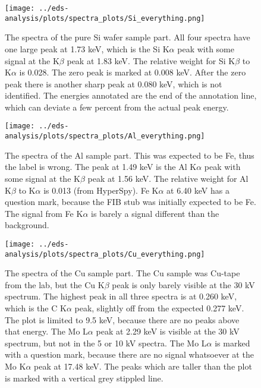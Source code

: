 
\begin{figure}
    \centering
    \texttt{[image: ../eds-analysis/plots/spectra\_plots/Si\_everything.png]}
    \caption{
        The spectra of the pure Si wafer sample part.
        All four spectra have one large peak at 1.73 keV, which is the Si K$\alpha$ peak with some signal at the K$\beta$ peak at 1.83 keV.
        The relative weight for Si K$\beta$ to K$\alpha$ is 0.028.
        The zero peak is marked at 0.008 keV.
        After the zero peak there is another sharp peak at 0.080 keV, which is not identified.
        The energies annotated are the end of the annotation line, which can deviate a few percent from the actual peak energy.
    }
    \label{fig:results:Spectra_Si}
\end{figure}

\begin{figure}
    \centering
    \texttt{[image: ../eds-analysis/plots/spectra\_plots/Al\_everything.png]}
    \caption{
        The spectra of the Al sample part.
        This was expected to be Fe, thus the label is wrong.
        The peak at 1.49 keV is the Al K$\alpha$ peak with some signal at the K$\beta$ peak at 1.56 keV.
        The relative weight for Al K$\beta$ to K$\alpha$ is 0.013 (from HyperSpy).
        Fe K$\alpha$ at 6.40 keV has a question mark, because the FIB stub was initially expected to be Fe.
        The signal from Fe K$\alpha$ is barely a signal different than the background.
    }
    \label{fig:results:Spectra_Al}
\end{figure}

\begin{figure}
    \centering
    \texttt{[image: ../eds-analysis/plots/spectra\_plots/Cu\_everything.png]}
    \caption{
        The spectra of the Cu sample part.
        The Cu sample was Cu-tape from the lab, but the Cu K$\beta$ peak is only barely visible at the 30 kV spectrum.
        The highest peak in all three spectra is at 0.260 keV, which is the C K$\alpha$ peak, slightly off from the expected 0.277 keV.
        The plot is limited to 9.5 keV, because there are no peaks above that energy.
        The Mo L$\alpha$ peak at 2.29 keV is visible at the 30 kV spectrum, but not in the 5 or 10 kV spectra.
        The Mo L$\alpha$ is marked with a question mark, because there are no signal whatsoever at the Mo K$\alpha$ peak at 17.48 keV.
        The peaks which are taller than the plot is marked with a vertical grey stippled line.
    }
    \label{fig:results:Spectra_Cu}
\end{figure}

